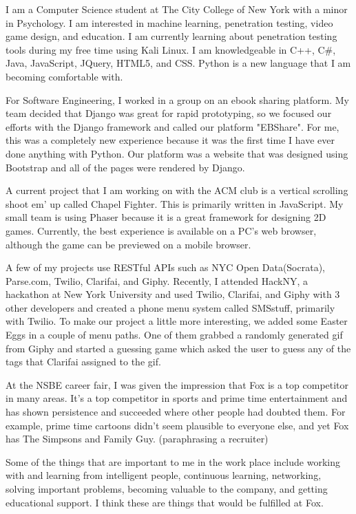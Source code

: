 \begin{cvletter}

I am a Computer Science student at The City College of New York with a minor
in Psychology. I am interested in machine learning, penetration testing, video
game design, and education. I am currently learning about penetration testing
tools during my free time using Kali Linux. I am knowledgeable in C++, C\#,
Java, JavaScript, JQuery, HTML5, and CSS. Python is a new language that I am
becoming comfortable with.
\par
For Software Engineering, I worked in a group on an ebook sharing platform. My
team decided that Django was great for rapid prototyping, so we focused our
efforts with the Django framework and called our platform "EBShare".
For me, this was a completely new experience because it was the first time 
I have ever done anything with Python. Our platform was a website that was
designed using Bootstrap and all of the pages were rendered by Django.
\par
A current project that I am working on with the ACM club is a vertical
scrolling shoot em' up called Chapel Fighter. This is primarily written in
JavaScript. My small team is using Phaser because it is a great framework for
designing 2D games. Currently, the best experience is available on a PC's
web browser, although the game can be previewed on a mobile browser.
\par
A few of my projects use RESTful APIs such as NYC Open
Data(Socrata), Parse.com, Twilio, Clarifai, and Giphy. Recently, I attended
HackNY, a hackathon at New York University and used Twilio, Clarifai, and
Giphy with 3 other developers and created a phone menu system called SMSstuff,
primarily with Twilio. To make our project a little more interesting, we added
some Easter Eggs in a couple of menu paths. One of them grabbed a randomly
generated gif from Giphy and started a guessing game which asked the user to
guess any of the tags that Clarifai assigned to the gif.

At the NSBE career fair, I was given the impression that Fox is a top
competitor in many areas. It's a top competitor in sports and prime time
entertainment and has shown persistence and succeeded where other people had
doubted them. For example, prime time cartoons didn't seem plausible to
everyone else, and yet Fox has The Simpsons and Family Guy. (paraphrasing a
recruiter)
\par
Some of the things that are important to me in the work place include working
with and learning from intelligent people, continuous learning, networking,
solving important problems, becoming valuable to the company, and getting
educational support. I think these are things that would be fulfilled at Fox.


\end{cvletter}
